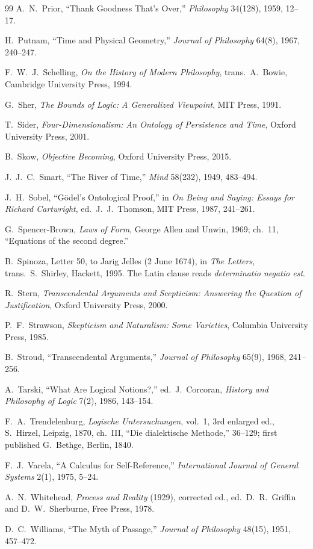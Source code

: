 \documentclass[11pt]{article}
\begin{document}
\begin{thebibliography}{99}
 A.\ N.\ Prior, ``Thank Goodness That's Over,'' \emph{Philosophy} 34(128), 1959, 12--17.

 H.\ Putnam, ``Time and Physical Geometry,'' \emph{Journal of Philosophy} 64(8), 1967, 240--247.

 F.\ W.\ J.\ Schelling, \emph{On the History of Modern Philosophy}, trans.\ A.\ Bowie, Cambridge University Press, 1994.

 G.\ Sher, \emph{The Bounds of Logic: A Generalized Viewpoint}, MIT Press, 1991.

 T.\ Sider, \emph{Four-Dimensionalism: An Ontology of Persistence and Time}, Oxford University Press, 2001.

 B.\ Skow, \emph{Objective Becoming}, Oxford University Press, 2015.

 J.\ J.\ C.\ Smart, ``The River of Time,'' \emph{Mind} 58(232), 1949, 483--494.

 J.\ H.\ Sobel, ``G\"odel's Ontological Proof,'' in \emph{On Being and Saying: Essays for Richard Cartwright}, ed.\ J.\ J.\ Thomson, MIT Press, 1987, 241--261.

 G.\ Spencer-Brown, \emph{Laws of Form}, George Allen and Unwin, 1969; ch.\ 11, ``Equations of the second degree.''

 B.\ Spinoza, Letter 50, to Jarig Jelles (2 June 1674), in \emph{The Letters}, trans.\ S.\ Shirley, Hackett, 1995. The Latin clause reads \emph{determinatio negatio est}.

 R.\ Stern, \emph{Transcendental Arguments and Scepticism: Answering the Question of Justification}, Oxford University Press, 2000.

 P.\ F.\ Strawson, \emph{Skepticism and Naturalism: Some Varieties}, Columbia University Press, 1985.

 B.\ Stroud, ``Transcendental Arguments,'' \emph{Journal of Philosophy} 65(9), 1968, 241--256.

 A.\ Tarski, ``What Are Logical Notions?,'' ed.\ J.\ Corcoran, \emph{History and Philosophy of Logic} 7(2), 1986, 143--154.

 F.\ A.\ Trendelenburg, \emph{Logische Untersuchungen}, vol.\ 1, 3rd enlarged ed., S.\ Hirzel, Leipzig, 1870, ch.\ III, ``Die dialektische Methode,'' 36--129; first published G.\ Bethge, Berlin, 1840.

 F.\ J.\ Varela, ``A Calculus for Self-Reference,'' \emph{International Journal of General Systems} 2(1), 1975, 5--24.

 A.\ N.\ Whitehead, \emph{Process and Reality} (1929), corrected ed., ed.\ D.\ R.\ Griffin and D.\ W.\ Sherburne, Free Press, 1978.

 D.\ C.\ Williams, ``The Myth of Passage,'' \emph{Journal of Philosophy} 48(15), 1951, 457--472.

\end{thebibliography}
\end{document}

